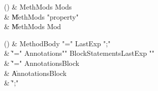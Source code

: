 \begin{bbgrammarappendix}

() & MethMods \label{prod:MethMods}  \: Mods\opt  \\

 &    \| MethMods \xcd"property"  \\
 &    \| MethMods Mod \\

\end{bbgrammarappendix}

\begin{bbgrammarappendix}

() & MethodBody \label{prod:MethodBody}  \: \xcd"=" LastExp \xcd";"  \\

 &    \| \xcd"=" Annotations\opt \xcd"{" BlockStatements\opt LastExp \xcd"}" \\
 &    \| \xcd"=" Annotations\opt Block \\
 &    \| Annotations\opt Block \\
 &    \| \xcd";" \\

\end{bbgrammarappendix}

